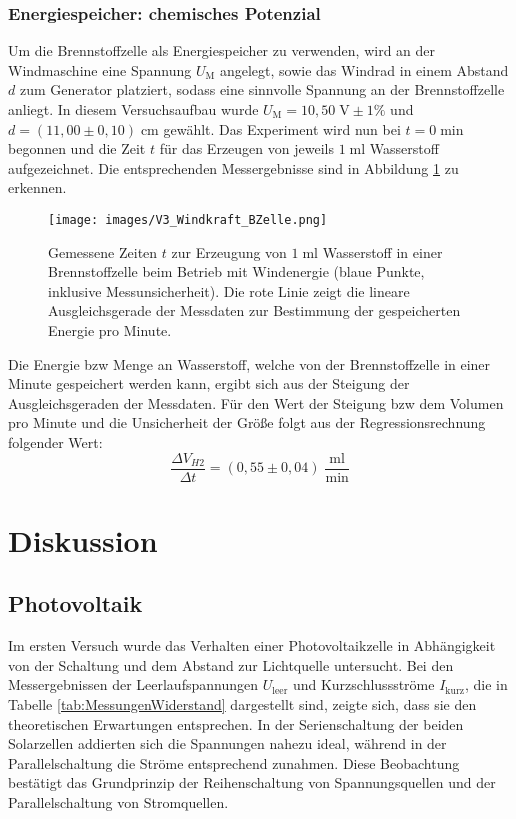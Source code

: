 \documentclass{article}
\begin{document}
\subsubsection{Energiespeicher: chemisches Potenzial}
\noindent Um die Brennstoffzelle als Energiespeicher zu verwenden, wird an der Windmaschine eine Spannung $U_\text{M}$ angelegt, sowie das Windrad in einem Abstand $d$ zum Generator platziert, sodass eine sinnvolle Spannung an der Brennstoffzelle anliegt. In diesem Versuchsaufbau wurde $U_\text{M} = 10{,}50  \; \text{V} \pm 1\%$ und $d=(11{,}00 \pm 0{,}10) \; \text{cm}$ gewählt. Das Experiment wird nun bei $t=0 \; \text{min}$ begonnen und die Zeit $t$ für das Erzeugen von jeweils $1 \; \text{ml}$ Wasserstoff aufgezeichnet. Die entsprechenden Messergebnisse sind in Abbildung \ref{fig:V3_WK_Speicher_BZ} zu erkennen.

\begin{figure}[H]
    \centering
    \texttt{[image: images/V3\_Windkraft\_BZelle.png]}
    \caption{Gemessene Zeiten $t$ zur Erzeugung von $1 \; \text{ml}$ Wasserstoff in einer Brennstoffzelle beim Betrieb mit Windenergie (blaue Punkte, inklusive Messunsicherheit).
    Die rote Linie zeigt die lineare Ausgleichsgerade der Messdaten zur Bestimmung der gespeicherten Energie pro Minute.}
    \label{fig:V3_WK_Speicher_BZ}
\end{figure}

\noindent Die Energie bzw Menge an Wasserstoff, welche von der Brennstoffzelle in einer Minute gespeichert werden kann, ergibt sich aus der Steigung der Ausgleichsgeraden der Messdaten. Für den Wert der Steigung bzw dem Volumen pro Minute und die Unsicherheit der Größe folgt aus der Regressionsrechnung folgender Wert:
$$\frac{\Delta V_{H2}}{\Delta t} = (0{,}55 \pm 0{,}04) \; \frac{\text{ml}}{\text{min}}$$

\section{Diskussion}

\subsection{Photovoltaik}
\noindent Im ersten Versuch wurde das Verhalten einer Photovoltaikzelle in Abhängigkeit von der Schaltung und dem Abstand zur Lichtquelle untersucht. Bei den Messergebnissen der Leerlaufspannungen $U_{\text{leer}}$ und Kurzschlussströme $I_{\text{kurz}}$, die in Tabelle \ref{tab:MessungenWiderstand} dargestellt sind, zeigte sich, dass sie den theoretischen Erwartungen entsprechen. In der Serienschaltung der beiden Solarzellen addierten sich die Spannungen nahezu ideal, während in der Parallelschaltung die Ströme entsprechend zunahmen. Diese Beobachtung bestätigt das Grundprinzip der Reihenschaltung von Spannungsquellen und der Parallelschaltung von Stromquellen.
\end{document}

